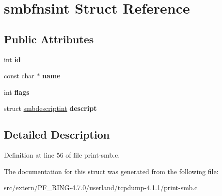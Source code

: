 \hypertarget{structsmbfnsint}{
\section{smbfnsint Struct Reference}
\label{structsmbfnsint}
}
\subsection*{Public Attributes}
\begin{DoxyCompactItemize}
\item 
\hypertarget{structsmbfnsint_adf9f5eb486809d4725202c523f5d8b8e}{
int {\bfseries id}}
\label{structsmbfnsint_adf9f5eb486809d4725202c523f5d8b8e}

\item 
\hypertarget{structsmbfnsint_a84bb68a0dff322ba511fd11d5ed9e8d0}{
const char $\ast$ {\bfseries name}}
\label{structsmbfnsint_a84bb68a0dff322ba511fd11d5ed9e8d0}

\item 
\hypertarget{structsmbfnsint_ab6501ce8d865de901bb3c96a0f438971}{
int {\bfseries flags}}
\label{structsmbfnsint_ab6501ce8d865de901bb3c96a0f438971}

\item 
\hypertarget{structsmbfnsint_a9f2701cc35109dcd4e712aee33a0484e}{
struct \hyperlink{structsmbdescriptint}{smbdescriptint} {\bfseries descript}}
\label{structsmbfnsint_a9f2701cc35109dcd4e712aee33a0484e}

\end{DoxyCompactItemize}


\subsection{Detailed Description}


Definition at line 56 of file print-\/smb.c.



The documentation for this struct was generated from the following file:\begin{DoxyCompactItemize}
\item 
src/extern/PF\_\-RING-\/4.7.0/userland/tcpdump-\/4.1.1/print-\/smb.c\end{DoxyCompactItemize}
